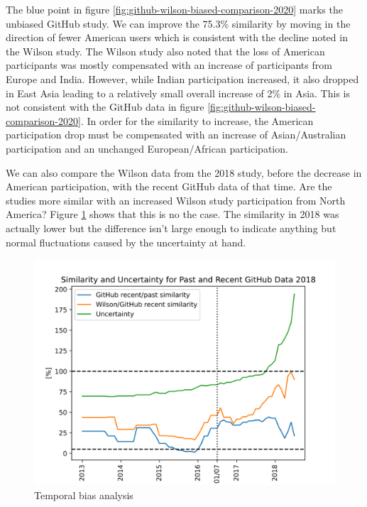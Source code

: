 \documentclass[]{article}
\begin{document}
The blue point in figure \ref{fig:github-wilson-biased-comparison-2020} marks the unbiased GitHub study. We can improve the 75.3\% similarity by moving in the direction of fewer American users which is consistent with the decline noted in the Wilson study. The Wilson study also noted that the loss of American participants was mostly compensated with an increase of participants from Europe and India. However, while Indian participation increased, it also dropped in East Asia leading to a relatively small overall increase of 2\% in Asia. This is not consistent with the GitHub data in figure \ref{fig:github-wilson-biased-comparison-2020}. In order for the similarity to increase, the American participation drop must be compensated with an increase of Asian/Australian participation and an unchanged European/African participation.

We can also compare the Wilson data from the 2018 study, before the decrease in American participation, with the recent GitHub data of that time. Are the studies more similar with an increased Wilson study participation from North America? Figure \ref{fig:temporal-bias-analysis-2018} shows that this is no the case. The similarity in 2018 was actually lower but the difference isn't large enough to indicate anything but normal fluctuations caused by the uncertainty at hand.

\begin{figure}

{\centering \includegraphics[width=1\linewidth]{img/temporal_bias_analysis_2018} 

}

\caption{Temporal bias analysis}\label{fig:temporal-bias-analysis-2018}
\end{figure}
\end{document}
